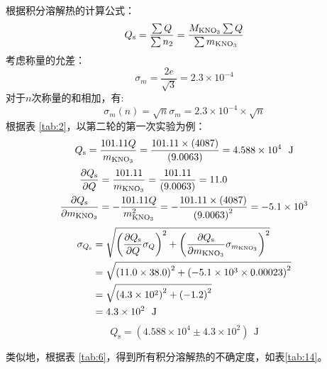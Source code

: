 \documentclass[cn,hazy,pku,12pt,normal,math=newtx,cite=super]{elegantnote}
\begin{document}
根据积分溶解热的计算公式：
\begin{equation}\label{eq:5}
    Q_{\mathrm{s}} = \frac{\sum Q}{\sum n_2} = \frac{M_{\ce{KNO_3}}\sum Q}{\sum m_{\ce{KNO_3}}}
\end{equation}
考虑称量的允差：
\begin{equation*}
    \sigma_{m} = \frac{2e}{\sqrt{3}} = 2.3\times 10^{-4}
\end{equation*}
对于$n$次称量的和相加，有:
\begin{equation*}
    \sigma_{m}(n) = \sqrt{n}\sigma_{m} = 2.3\times 10^{-4}\times \sqrt{n}
\end{equation*}
根据表 \ref{tab:2}，以第二轮的第一次实验为例：
\begin{equation*}
Q_{\mathrm{s}}=\frac{101.11 Q}{m_{\ce{KNO_3}}}=\frac{101.11 \times \left(4087\right)}{\left(9.0063\right)}=4.588 \times 10^{4}\ \mathrm{~J}    
\end{equation*}
\begin{equation*}
\begin{aligned}
\frac{\partial Q_{\mathrm{s}} }{\partial Q }&=\frac{101.11}{m_{\ce{KNO_3}}}=\frac{101.11}{\left(9.0063\right)}=11.0\\
\frac{\partial Q_{\mathrm{s}} }{\partial m_{\ce{KNO_3}} }&=- \frac{101.11 Q}{m_{\ce{KNO_3}}^{2}}=- \frac{101.11 \times \left(4087\right)}{\left(9.0063\right)^{2}}=-5.1 \times 10^{3}\\     
\end{aligned}
\end{equation*}
\begin{equation*}
\begin{aligned}
\sigma_{Q_{\mathrm{s}}}&=\sqrt{\left(\frac{\partial Q_{\mathrm{s}} }{\partial Q } \sigma_{Q}\right)^2+\left(\frac{\partial Q_{\mathrm{s}} }{\partial m_{\ce{KNO_3}} } \sigma_{m_{\ce{KNO_3}}}\right)^2}\\       
&=\sqrt{\left(11.0 \times 38.0\right)^2+\left(-5.1 \times 10^{3} \times 0.00023\right)^2}\\
&=\sqrt{\left(4.3 \times 10^{2}\right)^2+\left(-1.2\right)^2}\\
&=4.3 \times 10^{2}\ \mathrm{~J}
\end{aligned}
\end{equation*}
\begin{equation*}
Q_{\mathrm{s}}=\left (4.588 \times 10^{4} \pm 4.3 \times 10^{2} \right )\ \mathrm{~J}
\end{equation*}

类似地，根据表 \ref{tab:6}，得到所有积分溶解热的不确定度，如表\ref{tab:14}。
\end{document}
